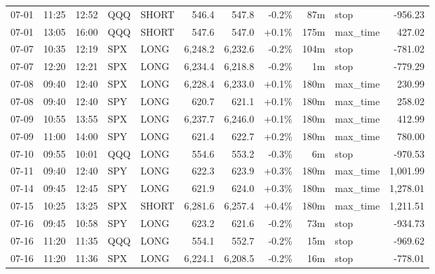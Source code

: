 \documentclass[11pt,a4paper,twoside]{article}
\begin{document}
\begin{center}
\begin{longtable}{>{\color{txtmain}}l l l l l r r r r >{\color{txtmain}}l r}
07-01 & 11:25 & 12:52 & QQQ & SHORT & 546.4 & 547.8 & \textcolor{lossred}{-0.2\%} & 87m & stop & \textcolor{lossred}{-956.23} \\
07-01 & 13:05 & 16:00 & QQQ & SHORT & 547.6 & 547.0 & \textcolor{wingreen}{+0.1\%} & 175m & max\_time & \textcolor{wingreen}{427.02} \\
07-07 & 10:35 & 12:19 & SPX & LONG & 6,248.2 & 6,232.6 & \textcolor{lossred}{-0.2\%} & 104m & stop & \textcolor{lossred}{-781.02} \\
07-07 & 12:20 & 12:21 & SPX & LONG & 6,234.4 & 6,218.8 & \textcolor{lossred}{-0.2\%} & 1m & stop & \textcolor{lossred}{-779.29} \\
07-08 & 09:40 & 12:40 & SPX & LONG & 6,228.4 & 6,233.0 & \textcolor{wingreen}{+0.1\%} & 180m & max\_time & \textcolor{wingreen}{230.99} \\
07-08 & 09:40 & 12:40 & SPY & LONG & 620.7 & 621.1 & \textcolor{wingreen}{+0.1\%} & 180m & max\_time & \textcolor{wingreen}{258.02} \\
07-09 & 10:55 & 13:55 & SPX & LONG & 6,237.7 & 6,246.0 & \textcolor{wingreen}{+0.1\%} & 180m & max\_time & \textcolor{wingreen}{412.99} \\
07-09 & 11:00 & 14:00 & SPY & LONG & 621.4 & 622.7 & \textcolor{wingreen}{+0.2\%} & 180m & max\_time & \textcolor{wingreen}{780.00} \\
07-10 & 09:55 & 10:01 & QQQ & LONG & 554.6 & 553.2 & \textcolor{lossred}{-0.3\%} & 6m & stop & \textcolor{lossred}{-970.53} \\
07-11 & 09:40 & 12:40 & SPY & LONG & 622.3 & 623.9 & \textcolor{wingreen}{+0.3\%} & 180m & max\_time & \textcolor{wingreen}{1,001.99} \\
07-14 & 09:45 & 12:45 & SPY & LONG & 621.9 & 624.0 & \textcolor{wingreen}{+0.3\%} & 180m & max\_time & \textcolor{wingreen}{1,278.01} \\
07-15 & 10:25 & 13:25 & SPX & SHORT & 6,281.6 & 6,257.4 & \textcolor{wingreen}{+0.4\%} & 180m & max\_time & \textcolor{wingreen}{1,211.51} \\
07-16 & 09:45 & 10:58 & SPY & LONG & 623.2 & 621.6 & \textcolor{lossred}{-0.2\%} & 73m & stop & \textcolor{lossred}{-934.73} \\
07-16 & 11:20 & 11:35 & QQQ & LONG & 554.1 & 552.7 & \textcolor{lossred}{-0.2\%} & 15m & stop & \textcolor{lossred}{-969.62} \\
07-16 & 11:20 & 11:36 & SPX & LONG & 6,224.1 & 6,208.5 & \textcolor{lossred}{-0.2\%} & 16m & stop & \textcolor{lossred}{-778.01} \\

\end{longtable}
\end{center}
\end{document}
